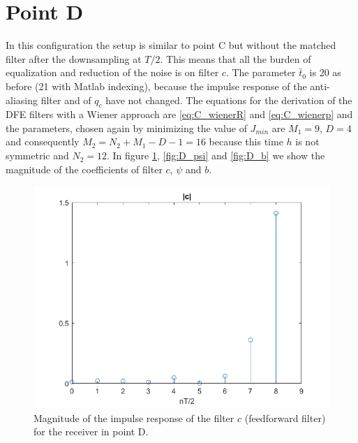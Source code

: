 \documentclass[a4paper,11.5pt]{article}
\begin{document}
\section*{Point D} 

In this configuration the setup is similar to point C but without the matched filter after the downsampling at $T/2$. This means that all the burden of equalization and reduction of the noise is on filter $c$. The parameter $\bar{t}_0$ is 20 as before (21 with Matlab indexing), because the impulse response of the anti-aliasing filter and of $q_c$ have not changed. The equations for the derivation of the DFE filters with a Wiener approach are \ref{eq:C_wienerR} and \ref{eq:C_wienerp} and the parameters, chosen again by minimizing the value of $J_{min}$ are $M_1=9$, $D=4$ and consequently $M_2=N_2+M_1-D-1=16$ because this time $h$ is not symmetric and $N_2=12$. In figure \ref{fig:D_c}, \ref{fig:D_psi} and \ref{fig:D_b} we show the magnitude of the coefficients of filter $c$, $\psi$ and $b$.

\begin{figure}[ht]
	\begin{center}   
		\includegraphics[width=\textwidth]{figs/D_c.png} 
		\caption{Magnitude of the impulse response of the filter $c$ (feedforward filter) for the receiver in point D.}
		\label{fig:D_c}
	\end{center}
\end{figure}
\end{document}
